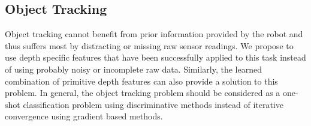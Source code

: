 \subsection{Object Tracking}

Object tracking cannot benefit from prior information provided by the robot and thus suffers most by distracting or missing raw sensor readings. We propose to use depth specific features that have been successfully applied to this task instead of using probably noisy or incomplete raw data. Similarly, the learned combination of primitive depth features can also provide a solution to this problem. In general, the object tracking problem should be considered as a one-shot classification problem using discriminative methods instead of iterative convergence using gradient based methods.
